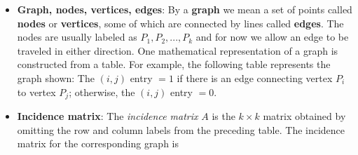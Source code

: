 \documentclass{report}
\begin{document}
\begin{itemize}
\begin{itemize}
\begin{align*}
\begin{bmatrix}
                                                                        x_{1} \\ x_{2}
                                                                    \end{bmatrix}\right) = \begin{bmatrix}
                                                                        ax_{1} + bx_{2} \\
                                                                        cx_{1} + dx_{2}
                                                                    \end{bmatrix} = \begin{bmatrix}
                                                                        a\ b \\
                                                                        c\ d
                                                                    \end{bmatrix} \begin{bmatrix}
                                                                        x_{1} \\ x_{2}
                                                                    \end{bmatrix} \\
                                                                    &= A\vec{\mathbf{x}}
                          .\end{align*}
                  \end{itemize}
              \item \textbf{Graph, nodes, vertices, edges}:
                  By a \textbf{graph} we mean a set of points called \textbf{nodes} or \textbf{vertices}, some of which are
                  connected by lines called \textbf{edges}. The nodes are usually labeled as $P_{1}, P_{2}, ..., P_{k} $ and for now we allow an edge to be traveled in either direction. One mathematical
                  representation of a graph is constructed from a table. For example, the following
                  table represents the graph shown:
                  \bigbreak \noindent 
                  \bigbreak \noindent 
                  The \( (i, j) \) entry \( = 1 \) if there is an edge connecting vertex \( P_i \) to vertex \( P_j \); otherwise, the \( (i, j) \) entry \( = 0 \). 
              \item \textbf{Incidence matrix}: The \textit{incidence matrix} \( A \) is the \( k \times k \) matrix obtained by omitting the row and column labels from the preceding table. The incidence matrix for the corresponding graph is

\end{itemize}
\end{document}
